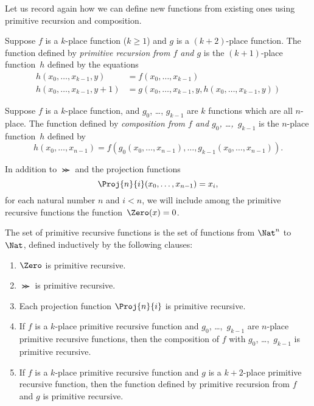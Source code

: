 \documentclass[../../../include/open-logic-section]{subfiles}
\begin{document}

Let us record again how we can define new functions from existing ones
using primitive recursion and composition.

\begin{defn}
   Suppose $f$ is a $k$-place
  function ($k\ge 1$) and $g$ is a $(k+2)$-place function. The
  function defined by \emph{primitive recursion from $f$ and $g$} is
  the $(k+1)$-place function~$h$ defined by the equations
  \begin{align*}
    h(x_0,\dots,x_{k-1},y) & =  f(x_0,\dots,x_{k-1}) \\
    h(x_0,\dots,x_{k-1},y+1) & = g(x_0,\dots,x_{k-1}, y, h(x_0,\dots,x_{k-1}, y))
  \end{align*}
\end{defn}

\begin{defn}
   Suppose $f$ is a $k$-place function, and
  $g_0$, \dots, $g_{k-1}$ are $k$ functions which are all
  $n$-place. The function defined by \emph{composition from $f$ and
    $g_0$, \dots,~$g_{k-1}$} is the $n$-place function~$h$ defined by
  \[
  h(x_0, \dots, x_{n-1}) =
  f(g_0(x_0, \dots, x_{n-1}), \dots, g_{k-1}(x_0, \dots, x_{n-1})).
  \]
\end{defn}

In addition to $\Succ$ and the projection functions
\[
\Proj{n}{i}(x_0,\dots,x_{n-1}) = x_i,
\]
for each natural number $n$ and $i < n$, we will include among the
primitive recursive functions the function~$\Zero(x) = 0$.

\begin{defn}
  The set of primitive recursive functions is the set of functions 
  from $\Nat^n$ to $\Nat$, defined inductively by the
  following clauses:
  \begin{enumerate}
  \item $\Zero$ is primitive recursive.
  \item $\Succ$ is primitive recursive.
  \item Each projection function $\Proj{n}{i}$ is primitive recursive.
  \item If $f$ is a $k$-place primitive recursive function and $g_0$,
    \dots,~$g_{k-1}$ are $n$-place primitive recursive functions, then
    the composition of $f$ with $g_0$, \dots,~$g_{k-1}$ is primitive
    recursive.
  \item If $f$ is a $k$-place primitive recursive function and $g$ is
    a $k+2$-place primitive recursive function, then the function
    defined by primitive recursion from $f$ and $g$ is primitive
    recursive.
\end{enumerate}
\end{defn}
\end{document}
